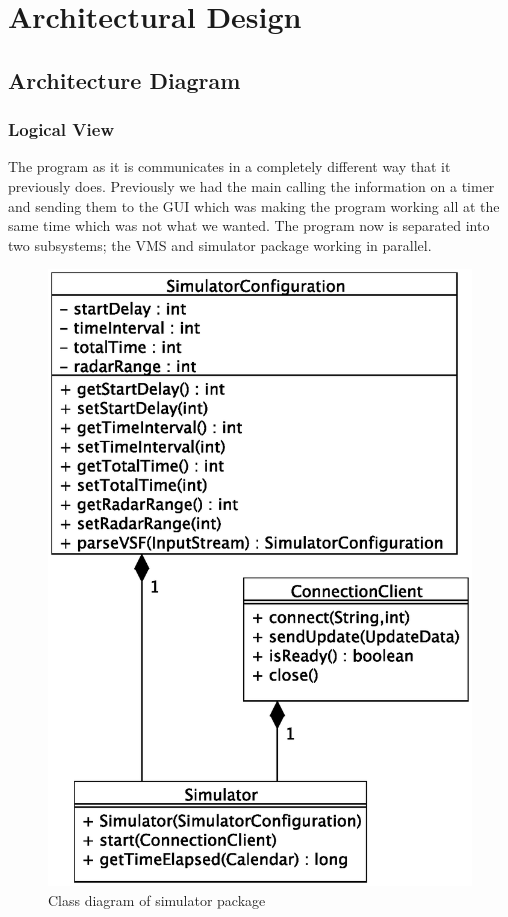 \documentclass{article}
\begin{document}
\section{Architectural Design} %

\subsection{Architecture Diagram}

\subsubsection{Logical View}

The program as it is communicates in a completely different way that it previously does. Previously we had the main calling the information on a timer and sending them to the GUI which was making the program working all at the same time which was not what we wanted. The program now is separated into two subsystems; the VMS and simulator package working in parallel.

\begin{figure}[h]
\caption{Class diagram of simulator package}
\centering
\includegraphics[scale=0.3]{diagrams/simulator-class-diagram.eps}
\end{figure}
\end{document}
